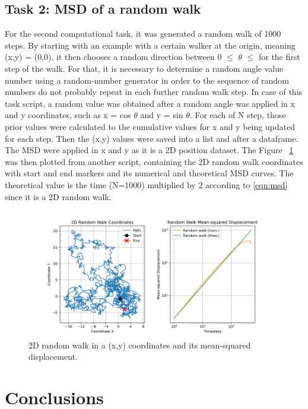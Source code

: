 \documentclass{article}
\begin{document}
\subsection{Task 2: MSD of a random walk}

For the second computational task, it was generated a random walk of 1000 steps. By starting with an example with a certain walker at the origin, meaning (x,y) = (0,0), it then chooses a random direction between 0 $\leq$ $\theta$ $\leq$ for the first step of the walk. For that, it is necessary to determine a random angle value number using a random-number generator in order to the sequence of random numbers do not probably repeat in each further random walk step. In case of this task script, a random value was obtained after a random angle was applied in x and y coordinates, such as x = cos $\theta$ and y = sin $\theta$. For each of N step, those prior values were calculated to the cumulative values for x and y being updated for each step. Then the (x,y) values were saved into a list and after a dataframe. The MSD were applied in x and y as it is a 2D position dataset. The Figure ~\ref{fig:msd_plot} was then plotted from another script, containing the 2D random walk coordinates with start and end markers and its numerical and theoretical MSD curves. The theoretical value is the time (N=1000) multiplied by 2 according to \ref{eqn:msd} since it is a 2D random walk.

\begin{figure}[H]
\includegraphics[width=\linewidth]{msd_plot.png}
\caption{2D random walk in a (x,y) coordinates and its mean-squared displacement.}
\label{fig:msd_plot}
\end{figure}

\section{Conclusions}
\end{document}

